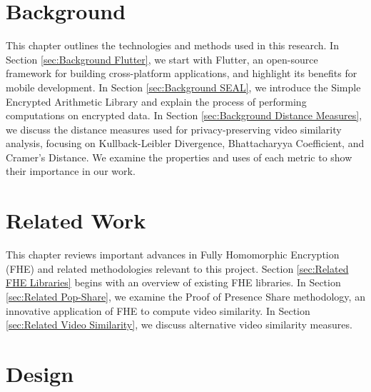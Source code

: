\documentclass [11pt, proquest] {uwthesis}[2020/02/24]
\begin{document}




 
\chapter{Background}

This chapter outlines the technologies and methods used in this research. In Section \ref{sec:Background Flutter}, we start with Flutter, an open-source framework for building cross-platform applications, and highlight its benefits for mobile development. In Section \ref{sec:Background SEAL}, we introduce the Simple Encrypted Arithmetic Library and explain the process of performing computations on encrypted data. In Section \ref{sec:Background Distance Measures}, we discuss the distance measures used for privacy-preserving video similarity analysis, focusing on Kullback-Leibler Divergence, Bhattacharyya Coefficient, and Cramer’s Distance. We examine the properties and uses of each metric to show their importance in our work.





 
\chapter{Related Work}

This chapter reviews important advances in Fully Homomorphic Encryption (FHE) and related methodologies relevant to this project. Section \ref{sec:Related FHE Libraries} begins with an overview of existing FHE libraries. In Section \ref{sec:Related Pop-Share}, we examine the Proof of Presence Share methodology, an innovative application of FHE to compute video similarity. In Section \ref{sec:Related Video Similarity}, we discuss alternative video similarity measures.





 
\chapter{Design}
\end{document}
